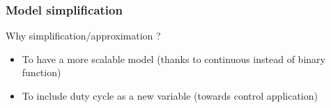 \begin{frame}
  \frametitle{Model simplification}
  \begin{block}{Why simplification/approximation ? }
  \begin{itemize}
  \item To have a more scalable model (thanks to continuous instead of binary function)
  \item To include duty cycle as a new variable (towards control application)
  \end{itemize}
  \end{block}
\end{frame}